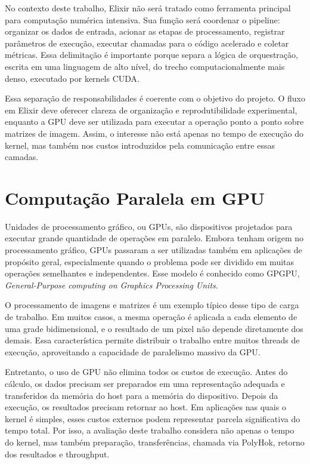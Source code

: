 \documentclass[tcc,capa]{texufpel}
\begin{document}
No contexto deste trabalho, Elixir não será tratado como ferramenta principal para
computação numérica intensiva. Sua função será coordenar o pipeline: organizar os
dados de entrada, acionar as etapas de processamento, registrar parâmetros de
execução, executar chamadas para o código acelerado e coletar métricas. Essa
delimitação é importante porque separa a lógica de orquestração, escrita em uma
linguagem de alto nível, do trecho computacionalmente mais denso, executado por
kernels CUDA.

Essa separação de responsabilidades é coerente com o objetivo do projeto. O fluxo
em Elixir deve oferecer clareza de organização e reprodutibilidade experimental,
enquanto a GPU deve ser utilizada para executar a operação ponto a ponto sobre
matrizes de imagem. Assim, o interesse não está apenas no tempo de execução do
kernel, mas também nos custos introduzidos pela comunicação entre essas camadas.

\section{Computação Paralela em GPU}

Unidades de processamento gráfico, ou GPUs, são dispositivos projetados para
executar grande quantidade de operações em paralelo. Embora tenham origem no
processamento gráfico, GPUs passaram a ser utilizadas também em aplicações de
propósito geral, especialmente quando o problema pode ser dividido em muitas
operações semelhantes e independentes. Esse modelo é conhecido como GPGPU,
\textit{General-Purpose computing on Graphics Processing Units}.

O processamento de imagens e matrizes é um exemplo típico desse tipo de carga de
trabalho. Em muitos casos, a mesma operação é aplicada a cada elemento de uma
grade bidimensional, e o resultado de um pixel não depende diretamente dos demais.
Essa característica permite distribuir o trabalho entre muitos threads de execução,
aproveitando a capacidade de paralelismo massivo da GPU.

Entretanto, o uso de GPU não elimina todos os custos de execução. Antes do cálculo,
os dados precisam ser preparados em uma representação adequada e transferidos da
memória do host para a memória do dispositivo. Depois da execução, os resultados
precisam retornar ao host. Em aplicações nas quais o kernel é simples, esses custos
externos podem representar parcela significativa do tempo total. Por isso, a avaliação
deste trabalho considera não apenas o tempo do kernel, mas também preparação,
transferências, chamada via PolyHok, retorno dos resultados e throughput.
\end{document}
